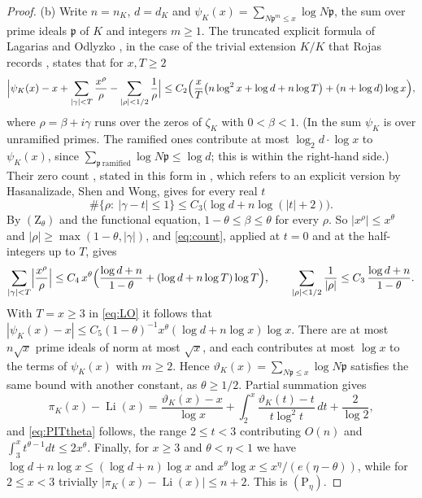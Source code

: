 \documentclass[11pt]{amsart}
\theoremstyle{definition}
\theoremstyle{remark}
\newcommand{\Zh}[1]{(\mathrm Z_{#1})}
\newcommand{\Ph}[1]{(\mathrm P_{#1})}
\newcommand{\Li}{\operatorname{Li}}
\newcommand{\fp}{\mathfrak p}
\begin{document}
\begin{proof}
(b) Write $n=n_K$, $d=d_K$ and $\psi_K(x)=\sum_{N\fp^m\le x}\log N\fp$, the sum over prime ideals $\fp$ of $K$ and integers $m\ge1$. The truncated explicit formula of Lagarias and Odlyzko \cite[Theorem~7.1]{LO}, in the case of the trivial extension $K/K$ that Rojas records \cite[Theorem~5, p.~7]{Roj}, states that for $x,T\ge2$
\begin{equation}\label{eq:LO}
 \Bigl|\psi_K(x)-x+\sum_{|\gamma|<T}\frac{x^\rho}{\rho}-\sum_{|\rho|<1/2}\frac1\rho\Bigr|
 \le C_2\Bigl(\frac xT\bigl(n\log^2x+\log d+n\log T\bigr)+(n+\log d)\log x\Bigr),
\end{equation}
where $\rho=\beta+i\gamma$ runs over the zeros of $\zeta_K$ with $0<\beta<1$. (In \cite{Roj} the sum $\psi_K$ is over unramified primes. The ramified ones contribute at most $\log_2d\cdot\log x$ to $\psi_K(x)$, since $\sum_{\fp\ \mathrm{ramified}}\log N\fp\le\log d$; this is within the right-hand side.) Their zero count \cite[Lemma~5.4]{LO}, stated in this form in \cite[proof of Lemma~11.2, p.~45]{OAIF}, which refers to an explicit version by Hasanalizade, Shen and Wong, gives for every real $t$
\begin{equation}\label{eq:count}
 \#\{\rho:\ |\gamma-t|\le1\}\le C_3\bigl(\log d+n\log(|t|+2)\bigr).
\end{equation}
By $\Zh\theta$ and the functional equation, $1-\theta\le\beta\le\theta$ for every $\rho$. So $|x^\rho|\le x^\theta$ and $|\rho|\ge\max(1-\theta,|\gamma|)$, and \eqref{eq:count}, applied at $t=0$ and at the half-integers up to $T$, gives
\[
 \sum_{|\gamma|<T}\Bigl|\frac{x^\rho}\rho\Bigr|\le C_4\,x^\theta\Bigl(\frac{\log d+n}{1-\theta}+(\log d+n\log T)\log T\Bigr),
 \qquad \sum_{|\rho|<1/2}\frac1{|\rho|}\le C_3\,\frac{\log d+n}{1-\theta}.
\]
With $T=x\ge3$ in \eqref{eq:LO} it follows that $|\psi_K(x)-x|\le C_5(1-\theta)^{-1}x^\theta(\log d+n\log x)\log x$. There are at most $n\sqrt x$ prime ideals of norm at most $\sqrt x$, and each contributes at most $\log x$ to the terms of $\psi_K(x)$ with $m\ge2$. Hence $\vartheta_K(x)=\sum_{N\fp\le x}\log N\fp$ satisfies the same bound with another constant, as $\theta\ge1/2$. Partial summation gives
\[
 \pi_K(x)-\Li(x)=\frac{\vartheta_K(x)-x}{\log x}+\int_2^x\frac{\vartheta_K(t)-t}{t\log^2t}\,dt+\frac2{\log2},
\]
and \eqref{eq:PITtheta} follows, the range $2\le t<3$ contributing $O(n)$ and $\int_3^xt^{\theta-1}dt\le2x^\theta$. Finally, for $x\ge3$ and $\theta<\eta<1$ we have $\log d+n\log x\le(\log d+n)\log x$ and $x^\theta\log x\le x^\eta/(e(\eta-\theta))$, while for $2\le x<3$ trivially $|\pi_K(x)-\Li(x)|\le n+2$. This is $\Ph\eta$.
\end{proof}
\end{document}
